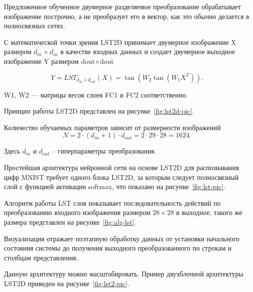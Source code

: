 Предложенное обученное двумерное разделяемое преобразование
обрабатывает изображение построчно, а не преобразует его в вектор, как это 
обычно делается в полносвязных сетях. 

С математической точки зрения LST2D принимает двумерное изображение X размером 
\(d_{in}\times d_{in}\) в качестве входных данных и создает двумерное выходное 
изображение Y размером dout\(\times\)dout

\begin{equation}
  Y = LST_{d_{in}\times d_{out}}(X) = \tan(W_2\tan(W_1X^T)).
\end{equation}

 W1, W2 — матрицы весов слоев FC1 и FC2 соответственно.

Принцип работы LST2D представлен на рисунке~\ref{fig:lst2d-pic}\cite{LST2D}. 


Количество обучаемых параметров зависит от размерности изображений
\begin{equation}
  N = 2 \cdot (d_{in}+1) \cdot d_{out} = 2 \cdot 29 \cdot 28 = 1624.
\end{equation}

Здесь \(d_{in}\) и \(d_{out}\) – гиперпараметры преобразования.

Простейшая архитектура нейронной сети на основе LST2D для распознавания цифр 
MNIST требует одного блока LST2D, за которым следует полносвязный слой с 
функцией активации softmax, что показано на 
рисунке~\ref{fig:lst-pic}\cite{LST2D}. 


Алгоритм работы LST слоя показывает последовательность действий по преобразованию
входного изображения размером \(28\times28\) в выходное, такого же размера 
представлен на рисунке~\ref{fig:alg-lst}. 


Визуализация отражает поэтапную обработку 
данных от установки начального состояния системы до получения выходного 
преобразованного по строкам и столбцам 
представления.

Данную архитектуру можно масштабировать. Пример двухблочной архитектуры LST2D 
приведен на рисунке~\ref{fig:lst2-pic}\cite{LST2D}.


